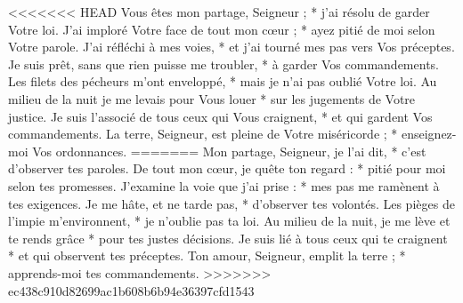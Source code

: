 <<<<<<< HEAD
Vous êtes mon partage, Seigneur ; * j'ai résolu de garder Votre loi.
\versseparator
J'ai imploré Votre face de tout mon cœur ; * ayez pitié de moi selon Votre parole.
\versseparator
J'ai réfléchi à mes voies, * et j'ai tourné mes pas vers Vos préceptes.
\versseparator
Je suis prêt, sans que rien puisse me troubler, * à garder Vos commandements.
\versseparator
Les filets des pécheurs m'ont enveloppé, * mais je n'ai pas oublié Votre loi.
\versseparator
Au milieu de la nuit je me levais pour Vous louer * sur les jugements de Votre justice.
\versseparator
Je suis l'associé de tous ceux qui Vous craignent, * et qui gardent Vos commandements.
\versseparator
La terre, Seigneur, est pleine de Votre miséricorde ; * enseignez-moi Vos ordonnances.
=======
Mon partage, Seigneur, je l’ai dit, *
c’est d’observer tes paroles.
\versseparator
De tout mon cœur, je quête ton regard : *
pitié pour moi selon tes promesses.
\versseparator
J’examine la voie que j’ai prise : *
mes pas me ramènent à tes exigences.
\versseparator
Je me hâte, et ne tarde pas, *
d’observer tes volontés.
\versseparator
Les pièges de l’impie m’environnent, *
je n’oublie pas ta loi.
\versseparator
Au milieu de la nuit, je me lève et te rends grâce *
pour tes justes décisions.
\versseparator
Je suis lié à tous ceux qui te craignent *
et qui observent tes préceptes.
\versseparator
Ton amour, Seigneur, emplit la terre ; *
apprends-moi tes commandements.
>>>>>>> ec438c910d82699ac1b608b6b94e36397cfd1543
